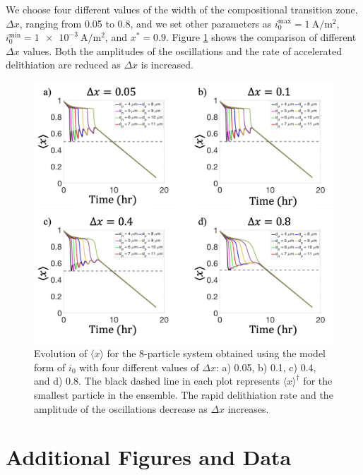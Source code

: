 \documentclass{article}
\begin{document}
We choose four different values of the width of the compositional transition zone, $\Delta x$, ranging from 0.05 to
0.8, and we set other parameters as
$i_0^{\mathrm{max}}=\SI{1}{\ampere\per\meter\squared}$,
$i_0^{\mathrm{min}}=\SI{1e-3}{\ampere\per\meter\squared}$, and
$x^\ast=0.9$. Figure \ref{fig:delta-x-sensitivity} shows the comparison of different
$\Delta x$ values. Both the amplitudes of the oscillations and the
rate of accelerated delithiation are reduced as $\Delta x$ is
increased.

\begin{figure}[hb]
  \centering
  \includegraphics[width=6.5in]{8-particle-evolution-deltax.png}
  \caption{Evolution of $\langle x\rangle$ for the
    8-particle system obtained using the model form of $i_0$ with
    four different values of $\Delta x$: a) 0.05, b) 0.1, c) 0.4, and d)
    0.8. The black dashed line in each plot represents
    $\langle x \rangle^\dag$ for the smallest particle in
    the ensemble. The rapid delithiation rate and the amplitude of
    the oscillations decrease as $\Delta x$ increases.}
  \label{fig:delta-x-sensitivity}
\end{figure}

\pagebreak
\section{Additional Figures and Data}
\end{document}
